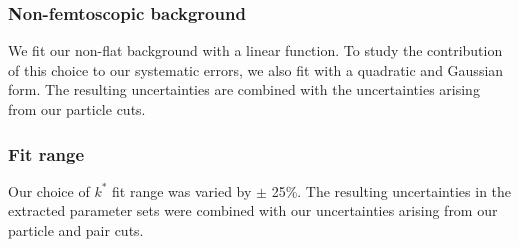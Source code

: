 \documentclass[/home/jesse/Analysis/FemtoAnalysis/AnalysisNotes/AnalysisNoteJBuxton.tex]{subfiles}
\begin{document}
\subsubsection{Non-femtoscopic background}
\label{SysErrsLamK0:NonFlatBgd}

We fit our non-flat background with a linear function.  To study the contribution of this choice to our systematic errors, we also fit with a quadratic and Gaussian form. The resulting uncertainties are combined with the uncertainties arising from our particle cuts.

\subsubsection{Fit range}
\label{SysErrsLamK0:FitRange}

Our choice of $k^{*}$ fit range was varied by $\pm$ 25\%.  The resulting uncertainties in the extracted parameter sets were combined with our uncertainties arising from our particle and pair cuts.
\end{document}

